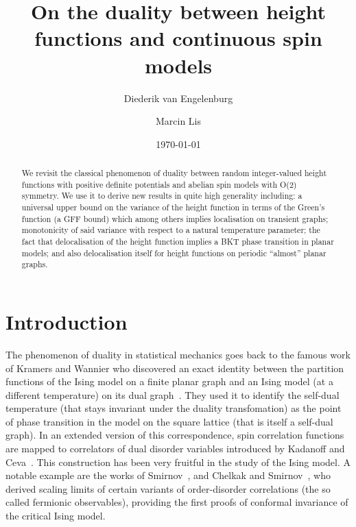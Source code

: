 \documentclass[11pt, reqno]{amsart}
\title{On the duality between height functions and continuous spin models}
\author{Diederik van Engelenburg \and Marcin Lis}
\date{\today}
\numberwithin{equation}{section}
\theoremstyle{definition}
\theoremstyle{remark}
\begin{document}
\maketitle 

\begin{abstract}
We revisit the classical phenomenon of duality between random integer-valued height functions with positive definite potentials and abelian spin models with O(2) symmetry. We use it to derive 
new results in quite high generality including: a universal upper bound on the variance of the height function in terms of the Green's function (a GFF bound) which among others implies localisation on transient graphs;
monotonicity of said variance with respect to a natural temperature parameter; the fact that delocalisation of the height function implies a BKT phase transition in planar models; and
also delocalisation itself for height functions on periodic ``almost'' planar graphs. 
\end{abstract}


\section{Introduction}
The phenomenon of duality in statistical mechanics goes back to the famous work of Kramers and Wannier who discovered an exact identity 
between the partition functions of the Ising model on a finite planar graph and an Ising model (at a different temperature) on its dual graph~\cite{KW}.
They used it to identify the {self-dual} temperature (that stays invariant under the duality transfomation) as the point of phase transition in the model on the square lattice (that is itself a self-dual graph). 
In an extended version of this correspondence, spin correlation functions are mapped to correlators of dual disorder variables introduced by Kadanoff and Ceva~\cite{KC}. 
This construction has been very fruitful in the study of the Ising model. A notable example are the works of Smirnov~\cite{smirnov}, and Chelkak and Smirnov~\cite{CheSmi}, who derived scaling limits of certain variants of order-disorder correlations (the so called fermionic observables), providing the first proofs of conformal invariance of the critical Ising model.
\end{document}
